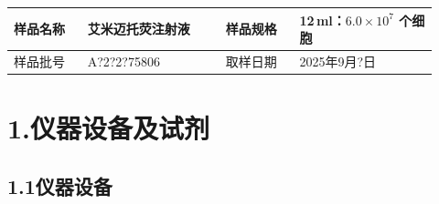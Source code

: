 \documentclass[UTF8,10pt,a4paper,fontset=fandol]{ctexart}
\newcommand{\fieldvalue}[1]{#1}
\newcommand{\handwritten}[1]{#1}
\begin{document}
\begin{tabular}{|p{0.16\linewidth}|p{0.30\linewidth}|p{0.16\linewidth}|p{0.30\linewidth}|}
\hline
样品名称 & 艾米迈托荧注射液 & 样品规格 & 12\,ml：$6.0\times10^7$ 个细胞\\
\hline
样品批号 &
\fieldvalue{\handwritten{A?2?2?75806}} &
取样日期 &
\fieldvalue{\handwritten{2025年9月?日}}\\
\hline
\end{tabular}

\section*{1.\quad 仪器设备及试剂}

\subsection*{1.1\quad 仪器设备}
\end{document}
